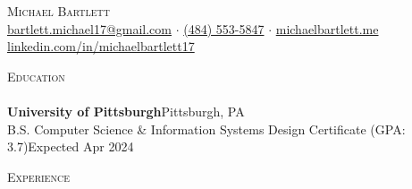 \documentclass[letterpaper]{article}
\newcommand{\lineunder} {
    \vspace*{-8pt} \\
    \hspace*{-18pt} \hrulefill \\
}
\newcommand{\header} [1] {
    {\hspace*{-18pt}\vspace*{6pt} \textsc{#1}}
    \vspace*{-6pt} \lineunder
}
\begin{document}
\vspace*{-40pt}



\vspace*{-10pt}
\begin{center}
    {\fontsize{17.28pt}{20pt}\selectfont \scshape {Michael Bartlett}}\\
    \href{mailto:bartlett.michael17@gmail.com}{bartlett.michael17@gmail.com} $\cdot$ \href{tel:4845535847}{(484) 553-5847} $\cdot$ \href{http://michaelbartlett.me}{michaelbartlett.me} \href{https://www.linkedin.com/in/michaelbartlett17/}{linkedin.com/in/michaelbartlett17} \\
\end{center}

\header{Education}
\textbf{University of Pittsburgh}\hfill Pittsburgh, PA\\
B.S. Computer Science \& Information Systems Design Certificate (GPA: 3.7)\hfill Expected Apr 2024\\
\vspace{2mm}

\header{Experience}
\vspace{1mm}
\end{document}

